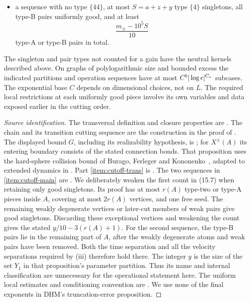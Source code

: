 \begin{proposition}
\begin{enumerate}[label=\textup{(\roman*)}]
\begin{itemize}
or type-B pair, and at least \(y/10-3(a+1)\) uniformly good
singletons;
\item a sequence with no type \(\{44\}\), at most
\(S=a+z+y\) type \(\{4\}\) singletons, all type-B pairs
uniformly good, and at least
\[
 \frac{m_\pm-10^5S}{10}
\]
type-A or type-B pairs in total.
\end{itemize}
\end{enumerate}
The singleton and pair types not counted for a gain have the neutral
kernels described above.  On graphs of polylogarithmic size and
bounded excess the indicated partitions and operation sequences
have at most \(C^b|\log\epsilon|^{C_*}\) subcases.  The exponential
base \(C\) depends on dimensional choices, not on \(L\).
The required local restrictions at each uniformly good piece involve
its own variables and data exposed earlier in the cutting order.
\end{proposition}

\begin{proof}[Source identification]
The transversal definition and closure properties are
\cite[Definition 15.3 and Proposition 15.4]{DHM2025}.
The chain and its transition cutting sequence are the construction
in the proof of \cite[Proposition 15.1, case (1)]{DHM2025}.
The displayed bound \(G\), including its realizability hypothesis,
is \cite[Proposition 15.2]{DHM2025}; for \(X^\pm(A)\) its
entering boundary consists of the stated connection bonds.
That proposition uses the hard-sphere collision bound of
Burago, Ferleger and Kononenko~\cite{BuragoFerlegerKononenko1998},
adapted to extended dynamics in \cite[Appendix A]{DHM2025}.
Part \ref{item:cutoff-trans} is
\cite[Proposition 15.6]{DHM2025}.
The two sequences in \ref{item:cutoff-main} are
\cite[Proposition 15.10, (15.7)--(15.8)]{DHM2025}.
We deliberately weaken the first count in (15.7) when retaining
only good singletons.  Its proof has at most \(r(A)\) type-two
or type-A pieces inside \(A\), covering at most \(2r(A)\)
vertices, and one free seed.  The remaining weakly degenerate
vertices or later-cut members of weak pairs give good
singletons.  Discarding these exceptional vertices and weakening
the count gives the stated \(y/10-3(r(A)+1)\).
For the second sequence, the type-B pairs lie in the remaining
part of \(A\), after the weakly degenerate atoms and weak pairs
have been removed. Both the time separation and all the
velocity separations required by (iii)
therefore hold there.
The integer \(y\) is the size of the set \(Y_1\) in that
proposition's parameter partition.  Thus its name and internal
classification are unnecessary for the operational statement here.
The uniform local estimates and conditioning convention are
.  We use none of the final exponents in
DHM's truncation-error proposition.
\end{proof}

